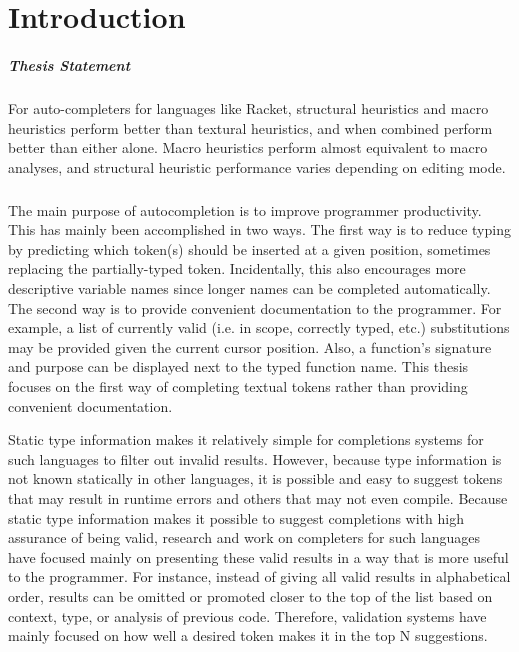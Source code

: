 \documentclass[ms,electronic,twosidetoc,letterpaper,chaptercenter,parttop,lol,lof,lot]{byumsphd}
\title{\Title}
\author{\Author}
\begin{document}
\maketitle
{}

\chapter{Introduction}

\paragraph{Thesis Statement} For auto-completers for languages like Racket, structural heuristics and macro heuristics perform better than textural heuristics, and when combined perform better than either alone.
Macro heuristics perform almost equivalent to macro analyses, and structural heuristic performance varies depending on editing mode.

\paragraph{} The main purpose of autocompletion is to improve programmer productivity.
This has mainly been accomplished in two ways.
The first way is to reduce typing by predicting which token(s) should be inserted at a given position, sometimes replacing the partially-typed token.
Incidentally, this also encourages more descriptive variable names since longer names can be completed automatically.
The second way is to provide convenient documentation to the programmer.
For example, a list of currently valid (i.e. in scope, correctly typed, etc.) substitutions may be provided given the current cursor position.
Also, a function's signature and purpose can be displayed next to the typed function name.
This thesis focuses on the first way of completing textual tokens rather than providing convenient documentation.

Static type information makes it relatively simple for completions systems for such languages to filter out invalid results.
However, because type information is not known statically in other languages, it is possible and easy to suggest tokens that may result in runtime errors and others that may not even compile.
Because static type information makes it possible to suggest completions with high assurance of being valid, research and work on completers for such languages have focused mainly on presenting these valid results in a way that is more useful to the programmer.
For instance, instead of giving all valid results in alphabetical order, results can be omitted or promoted closer to the top of the list based on context, type, or analysis of previous code.
Therefore, validation systems have mainly focused on how well a desired token makes it in the top N suggestions.
\end{document}
